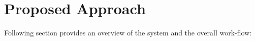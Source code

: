 \newcommand{\loft}[5]{\ensuremath{\textcolor{magenta}{\Omega{\bf \mathcal{L}}_{#1}^{#2,#3}}[\textcolor{blue}{\{#4\}}\textcolor{red}{(#5)}]}}

\newcommand{\affine}[5]{\ensuremath{\textcolor{magenta}{\Delta{\bf \mathcal{A}}_{#1}^{#2,#3}} [\textcolor{blue}{\{#4\}} \textcolor{red}{(#5)}]}}

\newcommand{\boolop}[5]{\ensuremath{\textcolor{magenta}{\Omega{\bf \mathcal{B}}_{#1}^{#2,#3}}[\textcolor{blue}{\{#4\}} \textcolor{red}{(#5)}]}}

\newcommand{\generic}[7]{\ensuremath{\textcolor{magenta}{#1{\bf \mathcal{#2}}_{#3}^{#4,#5}}[\textcolor{blue}{\{#6\}} \textcolor{red}{(#7)}]}}
\newtheorem{mydef}{Definition}
\newtheorem{mylem}{Remark}

\section{Proposed Approach}
\label{sec:approach}
Following section provides an overview of the system and the overall work-flow:

\bigskip

